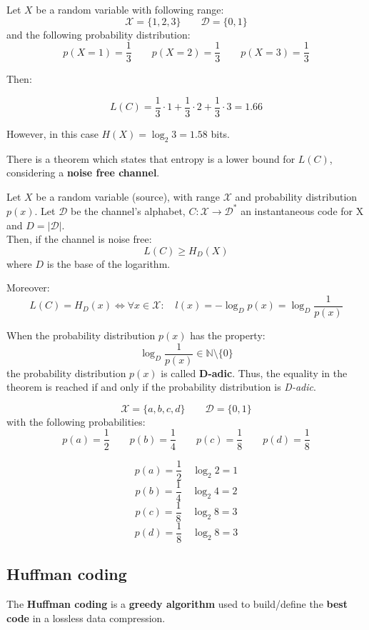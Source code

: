 \begin{exmp} Let $X$ be a random variable with following range:
	$$\mathcal{X} = \{1, 2, 3\} \qquad \mathcal{D} = \{0,1\}$$
	and the following probability distribution:
	$$p(X = 1) = \frac{1}{3} \qquad p(X = 2) = \frac{1}{3} \qquad p(X = 3) = \frac{1}{3}$$

Then:

$$
L(C) = \frac{1}{3} \cdot 1 + \frac{1}{3} \cdot 2 + \frac{1}{3} \cdot 3 = 1.66
$$

However, in this case $H(X) = \log_2 3 = 1.58$ bits.

\end{exmp}

There is a theorem which states that entropy is a lower bound for $L(C)$, considering a \textbf{noise free channel}.

\begin{thm} 
	Let $X$ be a random variable (source), with range $\mathcal{X}$ and probability distribution $p(x)$. 
	Let $\mathcal{D}$ be the channel's alphabet, $C : \mathcal{X} \rightarrow \mathcal{D}^*$ an instantaneous code for X and $D = |\mathcal{D}|$.\\
	Then, if the channel is noise free: 
	$$ L(C) \geq H_D(X)$$
	where $D$ is the base of the logarithm. 
	
	Moreover:
	$$ L(C) = H_D(x) \iff \forall x \in \mathcal{X}: \quad l(x) = -\log_D p(x) = \log_D \frac{1}{p(x)} $$
\end{thm}

When the probability distribution $p(x)$ has the property:
$$ \log_D \frac{1}{p(x)} \in \mathbb{N}\setminus\{0\}$$
the probability distribution $p(x)$ is called \textbf{D-adic}. Thus, the equality in the theorem is reached if and only if the probability distribution is \textit{D-adic}.

\begin{exmp}
$$\mathcal{X} = \{a, b, c, d\} \qquad \mathcal{D} = \{0,1\}$$
with the following probabilities:
$$p(a) = \frac{1}{2} \qquad p(b) = \frac{1}{4} \qquad p(c) = \frac{1}{8} \qquad p(d) = \frac{1}{8}$$

$$ p(a) = \frac{1}{2} \quad \log_2 2 = 1$$
$$ p(b) = \frac{1}{4} \quad \log_2 4 = 2$$
$$ p(c) = \frac{1}{8} \quad \log_2 8 = 3$$
$$ p(d) = \frac{1}{8} \quad \log_2 8 = 3$$
\end{exmp}

\subsection{Huffman coding}
The \textbf{Huffman coding} is a \textbf{greedy algorithm} used to build/define the \textbf{best code} in a lossless data compression.

